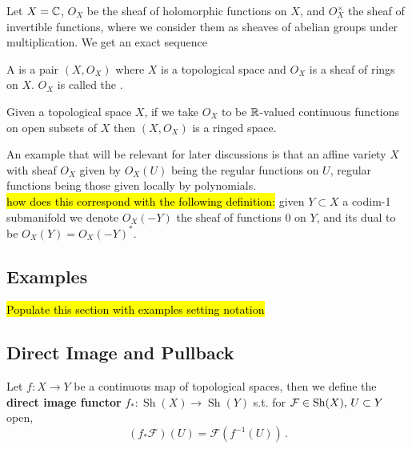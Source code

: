 \documentclass{article}
\begin{document}
\begin{example}
	Let $X=\mathbb{C}$, $O_X$ be the sheaf of holomorphic functions on $X$, and $O_X^\times$ the sheaf of invertible functions, where we consider them as sheaves of abelian groups under multiplication. We get an exact sequence 
\end{example}

\begin{definition}
	A  is a pair $(X,O_X)$ where $X$ is a topological space and $O_X$ is a sheaf of rings on $X$. $O_X$ is called the . 
\end{definition}

\begin{example}
	Given a topological space $X$, if we take $O_X$ to be $\mathbb{R}$-valued continuous functions on open subsets of $X$ then $(X,O_X)$ is a ringed space. 
\end{example}

\begin{example}
	An example that will be relevant for later discussions is that an affine variety $X$ with sheaf $O_X$ given by $O_X(U)$ being the regular functions on $U$, regular functions being those given locally by polynomials. \\
	\hl{how does this correspond with the following definition:} given $Y \subset X$ a codim-1 submanifold we denote $O_X(-Y)$ the sheaf of functions 0 on $Y$, and its dual to be $O_X(Y) = O_X(-Y)^\ast$. 
\end{example}

\subsection{Examples}
\hl{Populate this section with examples setting notation}


\subsection{Direct Image and Pullback}

\begin{definition}
	Let $f:X\to Y$ be a continuous map of topological spaces, then we define the \textbf{direct image functor} $f_\ast : \operatorname{Sh}(X) \to \operatorname{Sh}(Y)$ s.t. for $\mathcal{F} \in \operatorname{Sh}(X), \, U \subset Y$ open, 
	\[
	(f_\ast \mathcal{F})(U) = \mathcal{F}(f^{-1}(U)) \, .
	\]
\end{definition}
\end{document}

